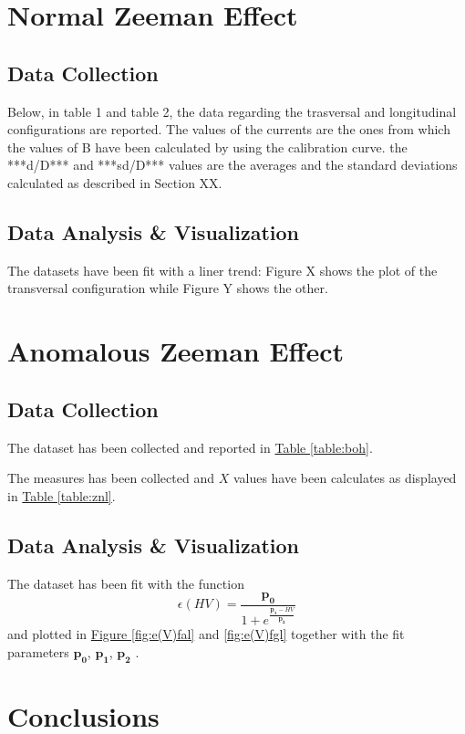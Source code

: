 \documentclass[a4paper,12pt,abstracton]{scrartcl}
\begin{document}
\section{Normal Zeeman Effect}

\subsection{Data Collection}


Below, in table 1 and table 2, the data regarding the trasversal and longitudinal configurations are reported. The values of the currents are the ones from which the values of B have been calculated by using the calibration curve. the ***d/D*** and ***sd/D*** values are the averages and the standard deviations calculated as described in Section XX.
            
\subsection{Data Analysis \& Visualization}

The datasets have been fit with a liner trend: Figure X shows the plot of the transversal configuration while Figure Y shows the other.

            

\section{Anomalous Zeeman Effect}


\subsection{Data Collection}
The dataset has been collected and reported in \hyperref[table:boh]{Table \ref*{table:boh}}. \newline 

The measures has been collected and $X$ values have been calculates as displayed in \hyperref[table:znl]{Table \ref*{table:znl}}.

\subsection{Data Analysis \& Visualization}
The dataset has been fit with the function $$\epsilon(HV)=\frac{\boldsymbol{p_0}}{1+e^{\frac{\boldsymbol{p_1}-HV}{\boldsymbol{p_2}}}}$$
and plotted in \hyperref[fig:e(V)fal]{Figure \ref*{fig:e(V)fal}} and \hyperref[fig:e(V)fgl]{ \ref*{fig:e(V)fgl}}  together with the fit parameters $\boldsymbol{p_0}$, $\boldsymbol{p_1}$, $\boldsymbol{p_2}$ .

\section{Conclusions}


%
%
\end{document}
